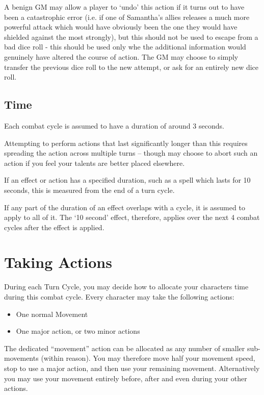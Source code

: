 A benign GM may allow a player to `undo' this action if it turns out to have been a catastrophic error (i.e. if one of Samantha's allies releases a much more powerful attack which would have obviously been the one they would have shielded against the most strongly), but this should not be used to escape from a bad dice roll - this should be used only whe the additional information would genuinely have altered the course of action. The GM may choose to simply transfer the previous dice roll to the new attempt, or ask for an entirely new dice roll. 


\subsection{Time}

Each combat cycle is assumed to have a duration of around 3 seconds. 

Attempting to perform actions that last significantly longer than this requires spreading the action across multiple turns -- though may choose to abort such an action if you feel your talents are better placed elsewhere. 

If an effect or action has a specified duration, such as a spell which lasts for 10 seconds, this is measured from the end of a turn cycle.

If any part of the duration of an effect overlaps with a cycle, it is assumed to apply to all of it. The `10 second' effect, therefore, applies over the next 4 combat cycles after the effect is applied. 


 \section{Taking Actions} \label{S:CombatActions}
 
 During each Turn Cycle, you may decide how to allocate your character\apos{}s time during this combat cycle. Every character may take the following actions: 
 
 \begin{itemize}
	\item One normal Movement
	\item One major action, or two minor actions
 \end{itemize}
 
 The dedicated ``movement'' action can be allocated as any number of smaller sub-movements (within reason). You may therefore move half your movement speed, stop to use a major action, and then use your remaining movement. Alternatively you may use your movement entirely before, after and even during your other actions.  
 
